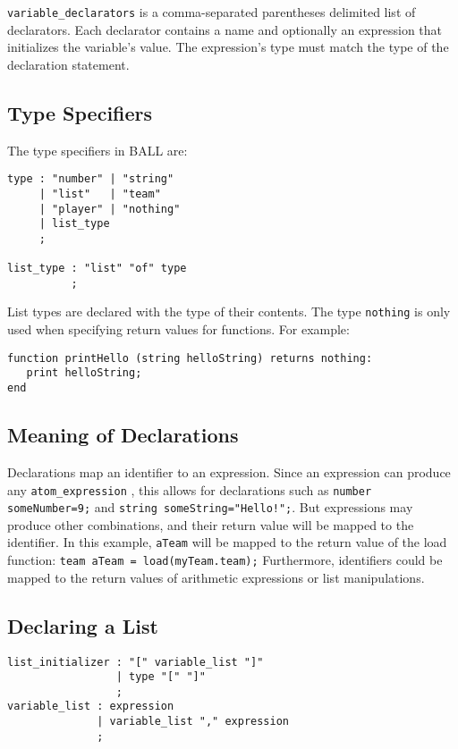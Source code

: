\texttt{variable\_declarators} is a comma-separated parentheses
delimited list of declarators. Each declarator contains a name and
optionally an expression that initializes the variable's value. The
expression's type must match the type of the declaration statement.

\subsection{Type Specifiers}

The type specifiers in BALL are: 

\begin{verbatim}
type : "number" | "string"
     | "list"   | "team"
     | "player" | "nothing"
     | list_type
     ;

list_type : "list" "of" type
          ;
\end{verbatim}

List types are declared with the type of their contents.  The type
\texttt{nothing} is only used when specifying return values for
functions. For example:

\begin{verbatim}
function printHello (string helloString) returns nothing:
   print helloString;
end
\end{verbatim}

\subsection{Meaning of Declarations}

Declarations map an identifier to an expression. Since an expression
can produce any \texttt{atom\_expression} , this allows for
declarations such as \texttt{number someNumber=9;} and \texttt{string
  someString="Hello!";}. But expressions may produce other
combinations, and their return value will be mapped to the
identifier. In this example, \texttt{aTeam} will be mapped to the
return value of the load function: \texttt{team aTeam =
  load(myTeam.team);} Furthermore, identifiers could be mapped to the
return values of arithmetic expressions or list manipulations.

\subsection{Declaring a List}\label{ListDecl}

\begin{verbatim}
list_initializer : "[" variable_list "]"
                 | type "[" "]"
                 ;
variable_list : expression
              | variable_list "," expression
              ;
\end{verbatim}

